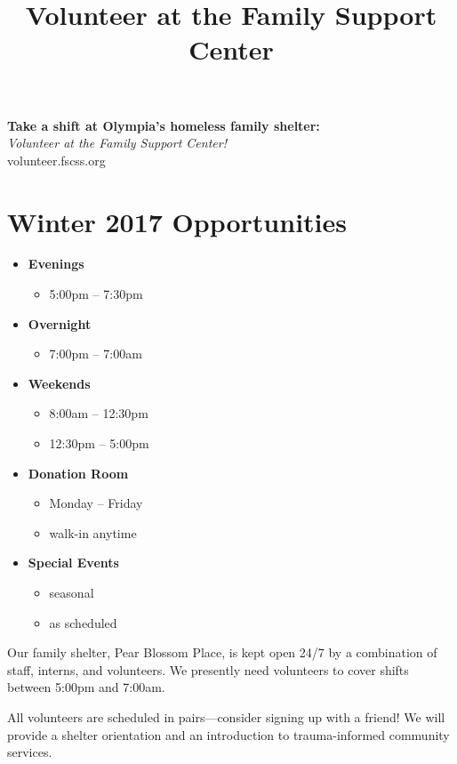 \documentclass[14pt]{extarticle}
\title{Volunteer at the Family Support Center}
\begin{document}
\pagestyle{empty}
\noindent
{\Huge \bf Take a shift at Olympia's homeless family shelter:}\\
{\LARGE \emph{Volunteer at the Family Support Center!}}\\
{\Huge {} \selectfont volunteer.fscss.org}


\section*{Winter 2017 Opportunities}

\begin{multicols}{2}
\begin{itemize}
    \item \textbf{Evenings}
   	\begin{itemize}
    	\item 5:00pm -- 7:30pm
    \end{itemize}
    \item \textbf{Overnight}
    \begin{itemize}
    	\item 7:00pm -- 7:00am
    \end{itemize}
    	\item \textbf{Weekends}
    \begin{itemize}
        \item 8:00am -- 12:30pm
        \item 12:30pm -- 5:00pm
    \end{itemize}
	\item \textbf{Donation Room}
        \begin{itemize}
        	\item Monday -- Friday
			\item walk-in anytime
        \end{itemize}
    \item \textbf{Special Events}
    	\begin{itemize}
        	\item seasonal
            \item as scheduled
        \end{itemize}
\end{itemize}
\end{multicols}

Our family shelter, Pear Blossom Place, is kept open 24/7 by a combination of staff, interns, and volunteers. We presently need volunteers to cover shifts between 5:00pm and 7:00am. 

All volunteers are scheduled in pairs---consider signing up with a friend! We will provide a shelter orientation and an introduction to trauma-informed community services. 
\end{document}
